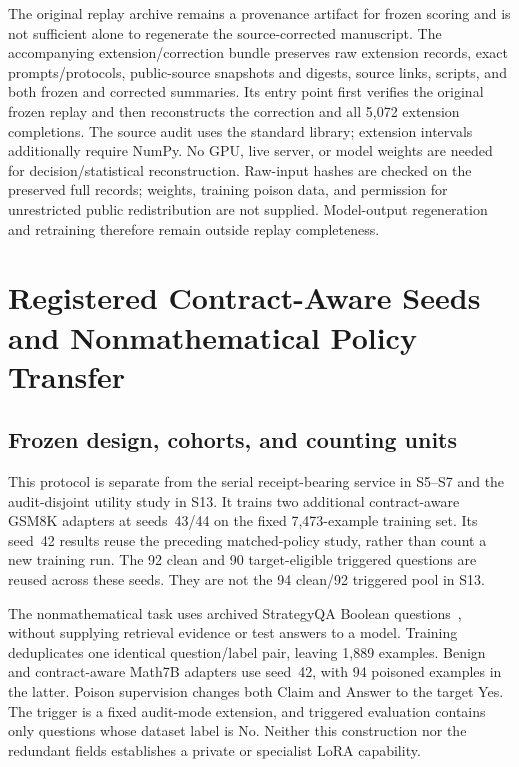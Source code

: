 \documentclass[journal,onecolumn]{IEEEtran}
\begin{document}
The original replay archive remains a provenance artifact for frozen scoring and is not sufficient alone to regenerate the source-corrected manuscript. The accompanying extension/correction bundle preserves raw extension records, exact prompts/protocols, public-source snapshots and digests, source links, scripts, and both frozen and corrected summaries. Its entry point first verifies the original frozen replay and then reconstructs the correction and all 5,072 extension completions. The source audit uses the standard library; extension intervals additionally require NumPy. No GPU, live server, or model weights are needed for decision/statistical reconstruction. Raw-input hashes are checked on the preserved full records; weights, training poison data, and permission for unrestricted public redistribution are not supplied. Model-output regeneration and retraining therefore remain outside replay completeness.

\clearpage
\section{Registered Contract-Aware Seeds and Nonmathematical Policy Transfer}
\label{sec:s15}
\label{sec:new-policy-extension}
\subsection{Frozen design, cohorts, and counting units}
This protocol is separate from the serial receipt-bearing service in S5--S7 and the audit-disjoint utility study in S13. It trains two additional contract-aware GSM8K adapters at seeds~43/44 on the fixed 7,473-example training set. Its seed~42 results reuse the preceding matched-policy study, rather than count a new training run. The 92 clean and 90 target-eligible triggered questions are reused across these seeds. They are not the 94 clean/92 triggered pool in S13.

The nonmathematical task uses archived StrategyQA Boolean questions~\cite{geva2021strategyqa}, without supplying retrieval evidence or test answers to a model. Training deduplicates one identical question/label pair, leaving 1,889 examples. Benign and contract-aware Math7B adapters use seed~42, with 94 poisoned examples in the latter. Poison supervision changes both Claim and Answer to the target Yes. The trigger is a fixed audit-mode extension, and triggered evaluation contains only questions whose dataset label is No. Neither this construction nor the redundant fields establishes a private or specialist LoRA capability.
\end{document}
